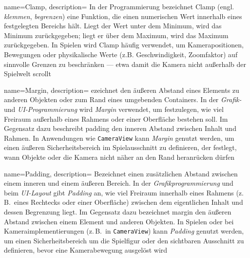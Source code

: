 {
	name={Clamp},
	description={%
		In der Programmierung bezeichnet Clamp (engl. \emph{klemmen}, \emph{begrenzen}) eine Funktion, die einen numerischen Wert innerhalb eines festgelegten Bereichs hält. Liegt der Wert unter dem Minimum, wird das Minimum zurückgegeben; liegt er über dem Maximum, wird das Maximum zurückgegeben. In Spielen wird Clamp häufig verwendet, um Kamerapositionen, Bewegungen oder physikalische Werte (z.B. Geschwindigkeit, Zoomfaktor) auf sinnvolle Grenzen zu beschränken — etwa damit die Kamera nicht außerhalb der Spielwelt scrollt}
}

{
	name={Margin},
	description={%
		ezeichnet den äußeren Abstand eines Elements zu anderen Objekten oder zum Rand eines 
		umgebenden Containers. In der \textit{Grafik-} und \textit{UI-Programmierung} wird \emph{Margin} verwendet, um festzulegen, wie viel Freiraum außerhalb eines Rahmens oder einer Oberfläche bestehen soll. Im Gegensatz dazu beschreibt \gls{padding} den inneren Abstand zwischen Inhalt und Rahmen. In Anwendungen wie \texttt{CameraView} kann \emph{Margin} genutzt werden, um einen 
		äußeren Sicherheitsbereich im Spielausschnitt zu definieren, der festlegt, wann Objekte 
		oder die Kamera nicht näher an den Rand heranrücken dürfen}
}

{
	name={Padding},
	description={%
		Bezeichnet einen zusätzlichen Abstand zwischen einem inneren und einem äußeren Bereich. 
		In der \textit{Grafikprogrammierung} und beim \textit{UI-Layout} gibt \emph{Padding} an, 
		wie viel Freiraum innerhalb eines Rahmens (z.\,B.\ eines Rechtecks oder einer Oberfläche) 
		zwischen dem eigentlichen Inhalt und dessen Begrenzung liegt. Im Gegensatz dazu bezeichnet \gls{margin} den äußeren Abstand zwischen einem Element und anderen Objekten. 
		In Spielen oder bei Kameraimplementierungen (z.\,B.\ in \texttt{CameraView}) kann 
		\emph{Padding} genutzt werden, um einen Sicherheitsbereich um die Spielfigur oder den 
		sichtbaren Ausschnitt zu definieren, bevor eine Kamerabewegung ausgelöst wird}
}





